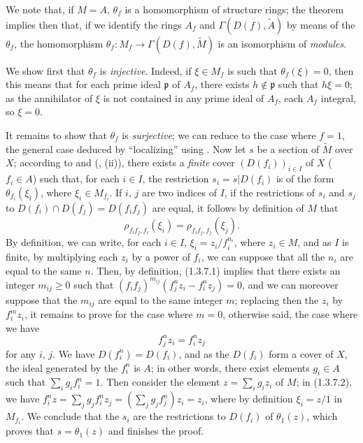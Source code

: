 We note that, if $M=A$, $\theta_f$ is a homomorphism of structure rings; the theorem
 implies then that, if we identify the rings $A_f$ and
$\Gamma(D(f),\widetilde{A})$ by means of the $\theta_f$, the homomorphism
$\theta_f:M_f\to\Gamma(D(f),\widetilde{M})$ is an isomorphism of \emph{modules}.

We show first that $\theta_f$ is \emph{injective}. Indeed, if $\xi\in M_f$ is such that
$\theta_f(\xi)=0$, then this means that for each prime ideal $\mathfrak{p}$ of $A_f$, there
exists $h\not\in\mathfrak{p}$ such that $h\xi=0$; as the annihilator of $\xi$ is not
contained in any prime ideal of $A_f$, each $A_f$ integral, so $\xi=0$.

It remains to show that $\theta_f$ is \emph{surjective}; we can reduce to the case where
$f=1$, the general case deduced by ``localizing'' using . Now let $s$ be a
section of $\widetilde{M}$ over $X$; according to  and
(, (ii)), there exists a \emph{finite} cover $(D(f_i))_{i\in I}$ of $X$
($f_i\in A$) such that, for each $i\in I$, the restriction $s_i=s|D(f_i)$ is of the form
$\theta_{f_i}(\xi_i)$, where $\xi_i\in M_{f_i}$. If $i$, $j$ are two indices of $I$, if
the restrictions of $s_i$ and $s_j$ to $D(f_i)\cap D(f_j)=D(f_i f_j)$ are equal, it follows
by definition of $M$ that
\[
  \rho_{f_i f_j,f_i}(\xi_i)=\rho_{f_i f_j,f_j}(\xi_j).
  \tag{1.3.7.1}
\]
By definition, we can write, for each $i\in I$, $\xi_i=z_i/f_i^{n_i}$, where $z_i\in M$, and
as $I$ is finite, by multiplying each $z_i$ by a power of $f_i$, we can suppose that all the
$n_i$ are equal to the same $n$. Then, by definition, (1.3.7.1) implies that there exists an
integer $m_{ij}\geqslant 0$ such that $(f_i f_j)^{m_{ij}}(f_j^n z_i-f_i^n z_j)=0$, and we can
moreover suppose that the $m_{ij}$ are equal to the same integer $m$; replacing then the
$z_i$ by $f_i^m z_i$, it remains to prove for the case where $m=0$, otherwise said, the case
where we have
\[
  f_j^n z_i=f_i^n z_j
  \tag{1.3.7.2}
\]
for any $i$, $j$. We have $D(f_i^n)=D(f_i)$, and as the $D(f_i)$ form a cover of $X$,
the ideal generated by the $f_i^n$ is $A$; in other words, there exist elements $g_i\in A$
such that $\sum_i g_i f_i^n=1$. Then consider the element $z=\sum_i g_i z_i$ of $M$; in
(1.3.7.2), we have $f_i^n z=\sum_j g_j f_i^n z_j=(\sum_j g_j f_j^n)z_i=z_i$, where by
definition $\xi_i=z/1$ in $M_{f_i}$. We conclude
that the $s_i$ are the restrictions to $D(f_i)$ of $\theta_1(z)$, which proves that
$s=\theta_1(z)$ and finishes the proof.

